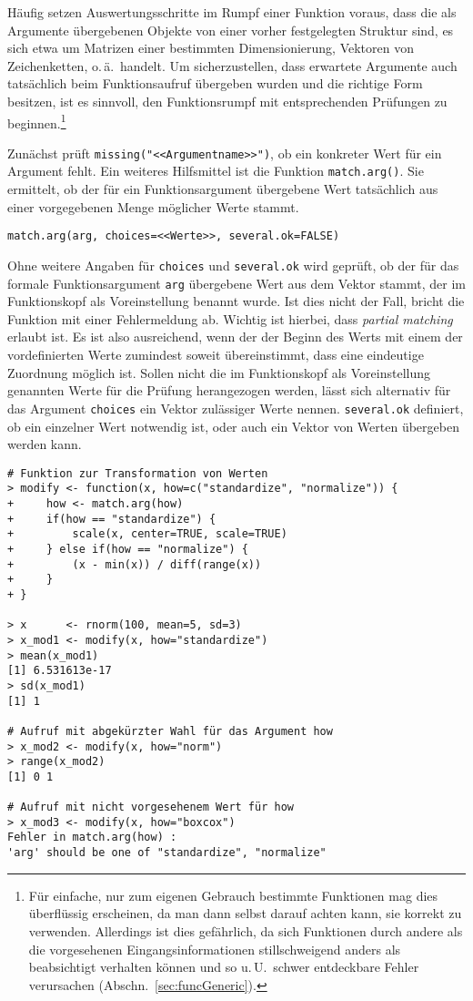 Häufig setzen Auswertungsschritte im Rumpf einer Funktion voraus, dass die als Argumente übergebenen Objekte von einer vorher festgelegten Struktur sind, es sich etwa um Matrizen einer bestimmten Dimensionierung, Vektoren von Zeichenketten, o.\,ä.\ handelt. Um sicherzustellen, dass erwartete Argumente auch tatsächlich beim Funktionsaufruf übergeben wurden und die richtige Form besitzen, ist es sinnvoll, den Funktionsrumpf mit entsprechenden Prüfungen zu beginnen.\footnote{Für einfache, nur zum eigenen Gebrauch bestimmte Funktionen mag dies überflüssig erscheinen, da man dann selbst darauf achten kann, sie korrekt zu verwenden. Allerdings ist dies gefährlich, da sich Funktionen durch andere als die vorgesehenen Eingangsinformationen stillschweigend anders als beabsichtigt verhalten können und so u.\,U.\ schwer entdeckbare Fehler verursachen (Abschn.\ \ref{sec:funcGeneric}).}

Zunächst prüft  \lstinline!missing("<<Argumentname>>")!, ob ein konkreter Wert für ein Argument fehlt. Ein weiteres Hilfsmittel ist die Funktion  \lstinline!match.arg()!. Sie ermittelt, ob der für ein Funktionsargument übergebene Wert tatsächlich aus einer vorgegebenen Menge möglicher Werte stammt.
\begin{lstlisting}
match.arg(arg, choices=<<Werte>>, several.ok=FALSE)
\end{lstlisting}

Ohne weitere Angaben für \lstinline!choices! und \lstinline!several.ok! wird geprüft, ob der für das formale Funktionsargument \lstinline!arg! übergebene Wert aus dem Vektor stammt, der im Funktionskopf als Voreinstellung benannt wurde. Ist dies nicht der Fall, bricht die Funktion mit einer Fehlermeldung ab. Wichtig ist hierbei, dass \emph{partial matching} erlaubt ist. Es ist also ausreichend, wenn der der Beginn des Werts mit einem der vordefinierten Werte zumindest soweit übereinstimmt, dass eine eindeutige Zuordnung möglich ist. Sollen nicht die im Funktionskopf als Voreinstellung genannten Werte für die Prüfung herangezogen werden, lässt sich alternativ für das Argument \lstinline!choices! ein Vektor zulässiger Werte nennen. \lstinline!several.ok! definiert, ob ein einzelner Wert notwendig ist, oder auch ein Vektor von Werten übergeben werden kann.
\begin{lstlisting}
# Funktion zur Transformation von Werten
> modify <- function(x, how=c("standardize", "normalize")) {
+     how <- match.arg(how)
+     if(how == "standardize") {
+         scale(x, center=TRUE, scale=TRUE)
+     } else if(how == "normalize") {
+         (x - min(x)) / diff(range(x))
+     }
+ }
 
> x      <- rnorm(100, mean=5, sd=3)
> x_mod1 <- modify(x, how="standardize")
> mean(x_mod1)
[1] 6.531613e-17
> sd(x_mod1)
[1] 1

# Aufruf mit abgekürzter Wahl für das Argument how
> x_mod2 <- modify(x, how="norm")
> range(x_mod2)
[1] 0 1

# Aufruf mit nicht vorgesehenem Wert für how
> x_mod3 <- modify(x, how="boxcox")
Fehler in match.arg(how) : 
'arg' should be one of "standardize", "normalize"
\end{lstlisting}    


